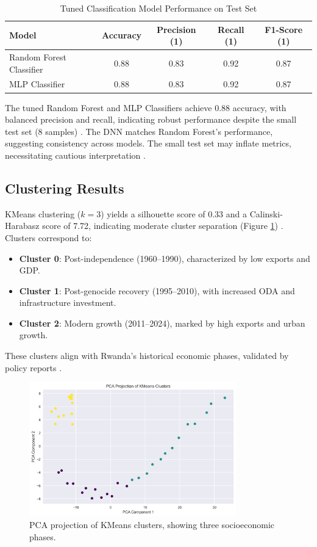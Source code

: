 \documentclass[12pt]{article}
\begin{document}
	\begin{table}[H]
		\centering
		\caption{Tuned Classification Model Performance on Test Set}
		\begin{tabular}{lcccc}
			\toprule
			Model & Accuracy & Precision (1) & Recall (1) & F1-Score (1) \\
			\midrule
			Random Forest Classifier & 0.88 & 0.83 & 0.92 & 0.87 \\
			MLP Classifier & 0.88 & 0.83 & 0.92 & 0.87 \\
			\bottomrule
		\end{tabular}
		\label{tab:classification_tuned}
	\end{table}
	
	The tuned Random Forest and MLP Classifiers achieve 0.88 accuracy, with balanced precision and recall, indicating robust performance despite the small test set (8 samples) \citep{geron}. The DNN matches Random Forest's performance, suggesting consistency across models. The small test set may inflate metrics, necessitating cautious interpretation \citep{hastie}.
	
	\subsection{Clustering Results}
	KMeans clustering ($k=3$) yields a silhouette score of 0.33 and a Calinski-Harabasz score of 7.72, indicating moderate cluster separation (Figure \ref{fig:clustering}) \citep{clustering_metrics}. Clusters correspond to:
	\begin{itemize}
		\item \textbf{Cluster 0}: Post-independence (1960–1990), characterized by low exports and GDP.
		\item \textbf{Cluster 1}: Post-genocide recovery (1995–2010), with increased ODA and infrastructure investment.
		\item \textbf{Cluster 2}: Modern growth (2011–2024), marked by high exports and urban growth.
	\end{itemize}
	These clusters align with Rwanda's historical economic phases, validated by policy reports \citep{rwanda_vision, eac}.			
	\begin{figure}[H]
		\centering
		\includegraphics[width=0.8\textwidth]{../clustering.png}
		\caption{PCA projection of KMeans clusters, showing three socioeconomic phases.}
		\label{fig:clustering}
	\end{figure}
	
\end{document}
